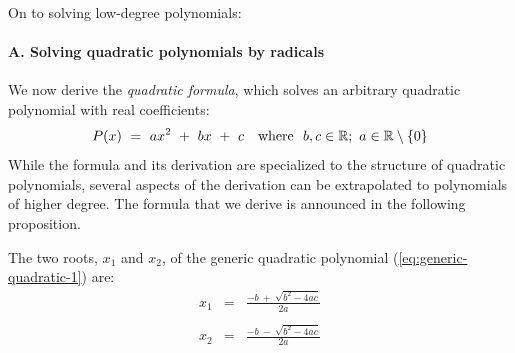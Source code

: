 \bigskip

\noindent
On to solving low-degree polynomials:

\paragraph{A. Solving quadratic polynomials by radicals}

 
We now derive the {\it quadratic formula}, which solves an arbitrary quadratic polynomial with real coefficients:  
\begin{equation}
\label{eq:generic-quadratic-1}
P(x) \ = \  ax^2 \ + \ bx \ + \ c \ \ \mbox{  where  } \ b,c \in \mathbb{R};
\ a \in \mathbb{R} \setminus \{0\}
\end{equation}
While the formula and its derivation are specialized to the structure of quadratic polynomials, several aspects of the derivation can be extrapolated to polynomials of higher degree.  The formula that we derive is announced in the following proposition.  

\begin{prop}
\label{thm:quadratic-formula}
The two roots, $x_1$ and $x_2$, of the generic quadratic polynomial (\ref{eq:generic-quadratic-1}) are:
\begin{eqnarray}
\nonumber
x_1 & = & \frac{-b \ + \ \sqrt{b^2 -4ac}}{2a} \\
\label{eq:generic-quadratic-4}
    &   & \\
\nonumber
x_2 & = & \frac{-b \ - \ \sqrt{b^2 -4ac}}{2a}
\end{eqnarray}
\end{prop}


